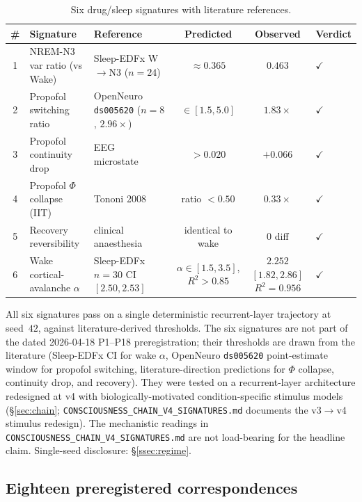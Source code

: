 \begin{table}[ht]
\centering
\small
\caption{Six drug/sleep signatures with literature references.}
\label{tab:six_signatures}
\begin{tabular}{c l l c c l}
\toprule
\# & Signature & Reference & Predicted & Observed & Verdict \\
\midrule
1 & NREM-N3 var ratio (vs Wake) &
   Sleep-EDFx W$\to$N3 ($n=24$)~\citep{SleepEDFx} &
   $\approx 0.365$ & $0.463$ & $\checkmark$ \\
2 & Propofol switching ratio &
   OpenNeuro \texttt{ds005620} ($n=8$, $2.96{\times}$)~\citep{OpenNeuroDS005620} &
   $\in[1.5, 5.0]$ & $1.83\times$ & $\checkmark$ \\
3 & Propofol continuity drop &
   EEG microstate~\citep{Brodbeck2012Microstates} &
   $> 0.020$ & $+0.066$ & $\checkmark$ \\
4 & Propofol $\Phi$ collapse (IIT) &
   Tononi 2008~\citep{Tononi2008} &
   ratio $< 0.50$ & $0.33\times$ & $\checkmark$ \\
5 & Recovery reversibility &
   clinical anaesthesia &
   identical to wake & $0$ diff & $\checkmark$ \\
6 & Wake cortical-avalanche $\alpha$ &
   Sleep-EDFx $n=30$ CI~$[2.50, 2.53]$~\citep{BeggsPlenz2003,SleepEDFx} &
   $\alpha\!\in\![1.5, 3.5]$, $R^{2}\!>\!0.85$ &
   $2.252$ $[1.82, 2.86]$ $R^{2}\!=\!0.956$ &
   $\checkmark$ \\
\bottomrule
\end{tabular}
\end{table}

All six signatures pass on a single deterministic recurrent-layer
trajectory at seed~$42$, against literature-derived thresholds. The six signatures
are not part of the dated 2026-04-18 P1--P18 preregistration; their
thresholds are drawn from the literature (Sleep-EDFx CI for
wake $\alpha$, OpenNeuro \texttt{ds005620} point-estimate window for
propofol switching, literature-direction predictions for $\Phi$
collapse, continuity drop, and recovery). They were tested on a
recurrent-layer architecture redesigned at v4 with
biologically-motivated condition-specific stimulus models
(\S\ref{sec:chain}; \texttt{CONSCIOUSNESS\_CHAIN\_V4\_SIGNATURES.md}
documents the v3$\to$v4 stimulus redesign). The mechanistic readings
in \texttt{CONSCIOUSNESS\_CHAIN\_V4\_SIGNATURES.md} are not
load-bearing for the headline claim. Single-seed disclosure:
\S\ref{ssec:regime}.

\subsection{Eighteen preregistered correspondences}\label{ssec:eighteen_prereg}

